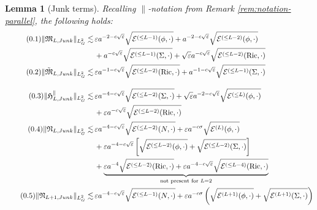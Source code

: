 \documentclass[11pt,leqno,textwidth=10cm]{amsart}
\numberwithin{equation}{section}
\theoremstyle{definition}
\theoremstyle{plain}
\newtheorem{lemma}[definition]{Lemma}
\newcommand{\1}{\mathbbm{1}}
\newcommand{\E}{\mathcal{E}}
\newcommand{\Ric}{\text{\normalfont{Ric}}}
\renewcommand{\epsilon}{\varepsilon}
\newcommand{\numberthis}{\addtocounter{equation}{1}\tag{\theequation}}
\renewcommand{\theequation}{\arabic{section}.\arabic{equation}}
\begin{document}
\begin{lemma}[Junk terms] Recalling $\parallel$-notation from Remark \ref{rem:notation-parallel}, the following holds:
\begin{subequations}
\begin{align*}
\numberthis\label{eq:L2-junk-M}\|\mathfrak{M}_{L,Junk}\|_{L^2_G}\lesssim
&\,\epsilon a^{-2-c\sqrt{\epsilon}}\sqrt{\E^{(\leq L-1)}(\phi,\cdot)}+a^{-2-c\sqrt{\epsilon}}\sqrt{\E^{(\leq L-2)}(\phi,\cdot)}%
\\
&\,+a^{-c\sqrt{\epsilon}}\sqrt{\E^{(\leq L-1)}(\Sigma,\cdot)}+\sqrt{\epsilon}a^{-c\sqrt{\epsilon}}\sqrt{\E^{(\leq L-2)}(\Ric,\cdot)}\\
\numberthis\label{eq:L2-junk-Mtilde}\|\tilde{\mathfrak{M}}_{L,Junk}\|_{L^2_G}\lesssim&\,\epsilon a^{-1-c\sqrt{\epsilon}}\sqrt{\E^{(\leq L-2)}(\Ric,\cdot)}+a^{-1-c\sqrt{\epsilon}}\sqrt{\E^{(\leq L-1)}(\Sigma,\cdot)}\\[1em]
\numberthis\label{eq:L2-junk-H-par}\|\mathfrak{H}_{L,Junk}^\parallel\|_{L^2_G}\lesssim&\,\epsilon a^{-4-c\sqrt{\epsilon}}\sqrt{\E^{(\leq L-2)}(\Sigma,\cdot)}+\sqrt{\epsilon}a^{-2-c\sqrt{\epsilon}}\sqrt{\E^{(\leq L)}(\phi,\cdot)}\\
&\,+\epsilon a^{-c\sqrt{\epsilon}}\sqrt{\E^{(\leq L-2)}(\Ric,\cdot)}\\
\numberthis\label{eq:L2-junk-N}\|\mathfrak{N}_{L,Junk}\|_{L^2_G}\lesssim&\,\epsilon a^{-4-c\sqrt{\epsilon}}\sqrt{\E^{(\leq L-2)}(N,\cdot)}+\epsilon a^{-c\sigma}\sqrt{\E^{(L)}(\phi,\cdot)}\\
&\,+\epsilon a^{-4-c\sqrt{\epsilon}}\left[\sqrt{\E^{(\leq L-2)}(\phi,\cdot)}+\sqrt{\E^{(\leq L-2)}(\Sigma,\cdot)}\right]\\
&\,+\underbrace{\epsilon a^{-4}\sqrt{\E^{(\leq L-2)}(\Ric,\cdot)}+\epsilon a^{-4-c\sqrt{\epsilon}}\sqrt{\E^{(\leq L-4)}(\Ric,\cdot)}}_{\text{not present for }L=2}\\
\numberthis\label{eq:L2-junk-N-odd}\|\mathfrak{N}_{L+1,Junk}\|_{L^2_G}\lesssim&\,\epsilon a^{-4-c\sqrt{\epsilon}}\sqrt{\E^{(\leq L-1)}(N,\cdot)}+\epsilon a^{-c\sigma}\left(\sqrt{\E^{(L+1)}(\phi,\cdot)}+\sqrt{\E^{(L+1)}(\Sigma,\cdot)}\right)\\

\end{align*}
\end{subequations}
\end{lemma}
\end{document}

